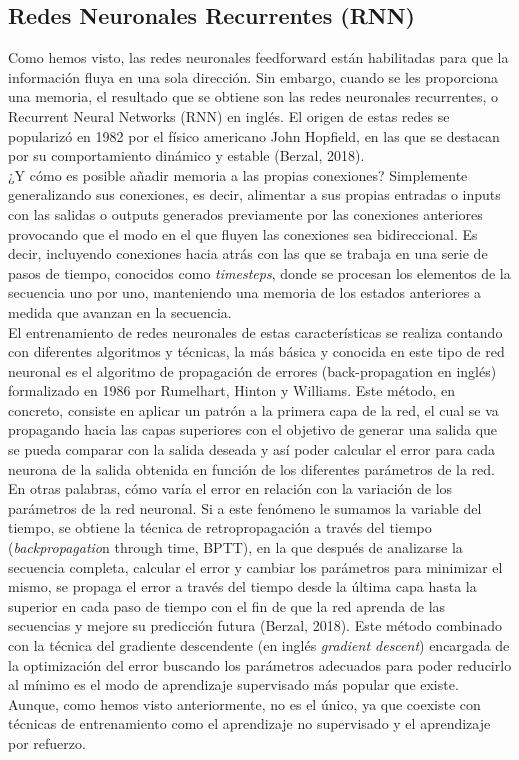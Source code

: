 \subsection{Redes Neuronales Recurrentes (RNN)} 

Como hemos visto, las redes neuronales feedforward están habilitadas para que la información fluya en una sola dirección. Sin embargo, cuando se les proporciona una memoria, el resultado que se obtiene son las redes neuronales recurrentes, o Recurrent Neural Networks (RNN) en inglés. El origen de estas redes se popularizó en 1982 por el físico americano John Hopfield, en las que se destacan por su comportamiento dinámico y estable (Berzal, 2018). \\

¿Y cómo es posible añadir memoria a las propias conexiones? Simplemente generalizando sus conexiones, es decir, alimentar a sus propias entradas o inputs con las salidas o outputs generados previamente por las conexiones anteriores provocando que el modo en el que fluyen las conexiones sea bidireccional. Es decir, incluyendo conexiones hacia atrás con las que se trabaja en una serie de pasos de tiempo, conocidos como \textit{timesteps}, donde se procesan los elementos de la secuencia uno por uno, manteniendo una memoria de los estados anteriores a medida que avanzan en la secuencia.\\

El entrenamiento de redes neuronales de estas características se realiza contando con diferentes algoritmos y técnicas, la más básica y conocida en este tipo de red neuronal es el algoritmo de propagación de errores (back-propagation en inglés) formalizado en 1986 por Rumelhart, Hinton y Williams. Este método, en concreto, consiste en aplicar un patrón a la primera capa de la red, el cual se va propagando hacia las capas superiores con el objetivo de generar una salida que se pueda comparar con la salida deseada y así poder calcular el error para cada neurona de la salida obtenida en función de los diferentes parámetros de la red. En otras palabras, cómo varía el error en relación con la variación de los parámetros de la red neuronal. Si a este fenómeno le sumamos la variable del tiempo, se obtiene la técnica de retropropagación a través del tiempo (\textit{backpropagatio}n through time, BPTT), en la que después de analizarse la secuencia completa, calcular el error y cambiar los parámetros para minimizar el mismo, se propaga el error a través del tiempo desde la última capa hasta la superior en cada paso de tiempo con el fin de que la red aprenda de las secuencias y mejore su predicción futura (Berzal, 2018). 
Este método combinado con la técnica del gradiente descendente (en inglés \textit{gradient descent}) encargada de la optimización del error buscando los parámetros adecuados para poder reducirlo al mínimo es el modo de aprendizaje supervisado más popular que existe.  Aunque, como hemos visto anteriormente, no es el único, ya que coexiste con técnicas de entrenamiento como el aprendizaje no supervisado y el aprendizaje por refuerzo. \\

